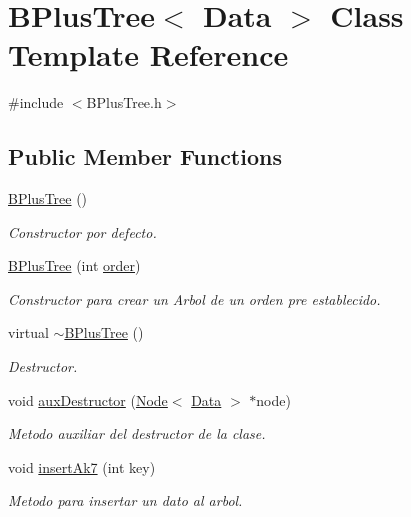 \hypertarget{classBPlusTree}{}\section{B\+Plus\+Tree$<$ Data $>$ Class Template Reference}
\label{classBPlusTree}


{\ttfamily \#include $<$B\+Plus\+Tree.\+h$>$}

\subsection*{Public Member Functions}
\begin{DoxyCompactItemize}
\item 
\hyperlink{classBPlusTree_a6a178fd510a5f67356e94ae9ae75ab5b}{B\+Plus\+Tree} ()
\begin{DoxyCompactList}\small\item\em Constructor por defecto. \end{DoxyCompactList}\item 
\hyperlink{classBPlusTree_a8e72d749013aed34df0e4a166ec431f5}{B\+Plus\+Tree} (int \hyperlink{classBPlusTree_a5c36dd5810d348dc87c106323311b1c5}{order})
\begin{DoxyCompactList}\small\item\em Constructor para crear un Arbol de un orden pre establecido. \end{DoxyCompactList}\item 
virtual \hyperlink{classBPlusTree_a33800c9324716875143eff1655b7ded0}{$\sim$\+B\+Plus\+Tree} ()
\begin{DoxyCompactList}\small\item\em Destructor. \end{DoxyCompactList}\item 
void \hyperlink{classBPlusTree_a4a5da00290010f91715426f17953fa73}{aux\+Destructor} (\hyperlink{classNode}{Node}$<$ \hyperlink{main_8cpp_a0c209e815d35b218025a240523b4335b}{Data} $>$ $\ast$node)
\begin{DoxyCompactList}\small\item\em Metodo auxiliar del destructor de la clase. \end{DoxyCompactList}\item 
void \hyperlink{classBPlusTree_ab980a458ae890fcebe8557a887fc14f4}{insert\+Ak7} (int key)
\begin{DoxyCompactList}\small\item\em Metodo para insertar un dato al arbol. \end{DoxyCompactList}\item 

\end{DoxyCompactItemize}
